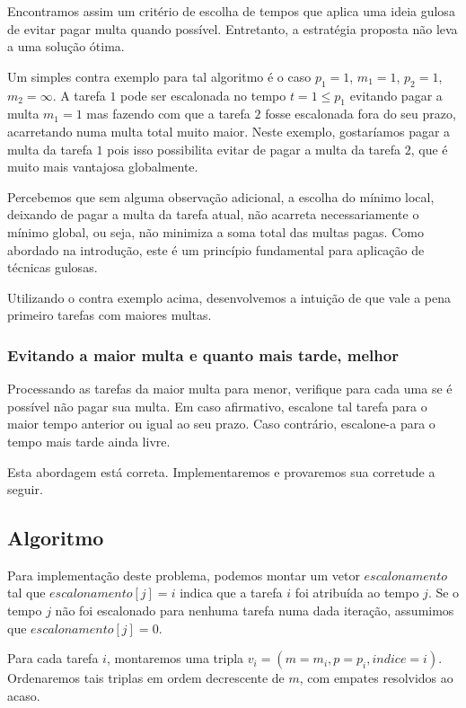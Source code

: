 Encontramos assim um critério de escolha de tempos que aplica uma ideia gulosa de evitar pagar multa quando possível. Entretanto, a estratégia proposta não leva a uma solução ótima.

Um simples contra exemplo para tal algoritmo é o caso $p_1 = 1$, $m_1 = 1$, $p_2 = 1$, $m_2 = \infty$. A tarefa $1$ pode ser escalonada no tempo $t = 1 \leq p_1$ evitando pagar a multa $m_1 = 1$ mas fazendo com que a tarefa $2$ fosse escalonada fora do seu prazo, acarretando numa multa total muito maior. Neste exemplo, gostaríamos pagar a multa da tarefa $1$ pois isso possibilita evitar de pagar a multa da tarefa $2$, que é muito mais vantajosa globalmente.

Percebemos que sem alguma observação adicional, a escolha do mínimo local, deixando de pagar a multa da tarefa atual, não acarreta necessariamente o mínimo global, ou seja, não minimiza a soma total das multas pagas. Como abordado na introdução, este é um princípio fundamental para aplicação de técnicas gulosas.

Utilizando o contra exemplo acima, desenvolvemos a intuição de que vale a pena  primeiro tarefas com maiores multas.

\subsubsection*{Evitando a maior multa e quanto mais tarde, melhor}

Processando as tarefas da maior multa para menor, verifique para cada uma se é possível não pagar sua multa. Em caso afirmativo, escalone tal tarefa para o maior tempo anterior ou igual ao seu prazo. Caso contrário, escalone-a para o tempo mais tarde ainda livre.

Esta abordagem está correta. Implementaremos e provaremos sua corretude a seguir.

\subsection{Algoritmo}

Para implementação deste problema, podemos montar um vetor $escalonamento$ tal que $escalonamento[j] = i$ indica que a tarefa $i$ foi atribuída ao tempo $j$. Se o tempo $j$ não foi escalonado para nenhuma tarefa numa dada iteração, assumimos que $escalonamento[j] = 0$.

Para cada tarefa $i$, montaremos uma tripla $v_i = (m = m_i, p = p_i, indice = i)$. Ordenaremos tais triplas em ordem decrescente de $m$, com empates resolvidos ao acaso. 

